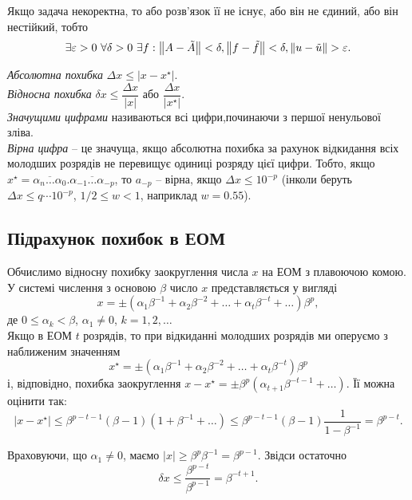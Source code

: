Якщо задача  некоректна, то або розв'язок її не існує, або він не єдиний, або він нестійкий, тобто \[\exists \epsilon > 0 \ws \forall \delta > 0 \ws \exists f: \left\|A-\tilde A\right\|<\delta, \left\|f-\tilde f\right\|<\delta, \left\|u-\tilde u\right\|>\epsilon.\]

\textit{Абсолютна похибка} $\Delta x\le |x-x^\star|$.\\

\textit{Відносна похибка} $\delta x\le \dfrac{\Delta x}{|x|}$ або $\dfrac{\Delta x}{|x^\star|}$.\\

\textit{Значущими цифрами} називаються всі цифри,починаючи з першої ненульової зліва.\\ 

\textit{Вірна цифра} -- це значуща, якщо абсолютна похибка за рахунок відкидання всіх молодших розрядів не перевищує одиниці розряду цієї цифри. Тобто, якщо $x^\star = \overline{\alpha_n\ldots\alpha_0}.\overline{\alpha_{-1}\ldots\alpha_{-p}}$, то $a_{-p}$ -- вірна, якщо $\Delta x\le 10^{-p}$ (інколи беруть $\Delta x\le q\cdots 10^{-p}$, $1/2\le w<1$, наприклад $w=0.55$).

\subsection{Підрахунок похибок в ЕОМ}

Обчислимо відносну похибку заокруглення числа $x$ на ЕОМ з плавоючою комою. У системі числення з основою $\beta$ число $x$ представляється у вигляді \begin{equation} \label{eq:x-beta-basis} x=\pm\left(\alpha_1\beta^{-1}+\alpha_2\beta^{-2}+\ldots+\alpha_t\beta^{-t}+\ldots\right)\beta^p, \end{equation} де $0\le\alpha_k<\beta$, $\alpha_1\ne0$, $k=1,2,\ldots$\\

Якщо в ЕОМ $t$ розрядів, то при відкиданні молодших розрядів ми оперуємо з наближеним значенням \[x^\star = \pm\left(\alpha_1\beta^{-1}+\alpha_2\beta^{-2}+\ldots+\alpha_t\beta^{-t}\right)\beta^p\] і, відповідно, похибка заокруглення $x-x^\star = \pm \beta^p\left(\alpha_{t+1}\beta^{-t-1}+\ldots\right)$. Її можна оцінити так: \[|x-x^\star|\le \beta^{p-t-1}(\beta-1)(1+\beta^{-1}+\ldots)\le \beta^{p-t-1}(\beta - 1)\dfrac1{1-\beta^{-1}}=\beta^{p-t}.\]

Враховуючи, що $\alpha_1\ne 0$, маємо $|x|\ge \beta^p\beta^{-1}=\beta^{p-1}$. Звідси остаточно \[\delta x\le \dfrac{\beta^{p-t}}{\beta^{p-1}}=\beta^{-t+1}.\]

